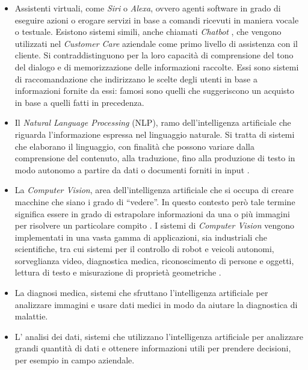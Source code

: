 \documentclass[12pt,italian]{report}
\begin{document}
	\begin{itemize}
		\item Assistenti virtuali, come \textit{Siri} o \textit{Alexa}, ovvero agenti software in grado di eseguire azioni o erogare servizi in base a comandi ricevuti in maniera vocale o testuale. Esistono sistemi simili, anche chiamati \textit{Chatbot} \cite{lalwani2018implementation}, che vengono utilizzati nel \textit{Customer Care} aziendale come primo livello di assistenza con il cliente. Si contraddistinguono per la loro capacità di comprensione del tono del dialogo e di memorizzazione delle informazioni raccolte. Essi sono sistemi di raccomandazione che indirizzano le scelte degli utenti in base a informazioni fornite da essi: famosi sono quelli che suggeriscono un acquisto in base a quelli fatti in precedenza.
		
		\item Il \textit{Natural Language Processing} (NLP), ramo dell’intelligenza artificiale che riguarda l’informazione espressa nel linguaggio naturale. Si tratta di sistemi che elaborano il linguaggio, con finalità che possono variare dalla comprensione del contenuto, alla traduzione, fino alla produzione di testo in modo autonomo a partire da dati o documenti forniti in input \cite{cambria2014jumping}.
		
		\item La \textit{Computer Vision}, area dell'intelligenza artificiale che si occupa di creare macchine che siano i grado di ``vedere''. In questo contesto però tale termine significa essere in grado di estrapolare informazioni da una o più immagini per risolvere un particolare compito \cite{DANUSER2011973}. I sistemi di \textit{Computer Vision} vengono implementati in una vasta gamma di applicazioni, sia industriali che scientifiche, tra cui sistemi per il controllo di robot e veicoli autonomi, sorveglianza video, diagnostica medica, riconoscimento di persone e oggetti, lettura di testo e misurazione di proprietà geometriche \cite{szeliski2022computer}.
		
		\item La diagnosi medica, sistemi che sfruttano l'intelligenza artificiale per analizzare immagini e usare dati medici in modo da aiutare la diagnostica di malattie.
		\item L' analisi dei dati, sistemi che utilizzano l'intelligenza artificiale per analizzare grandi quantità di dati e ottenere informazioni utili per prendere decisioni, per esempio in campo aziendale.
	\end{itemize}
\end{document}

